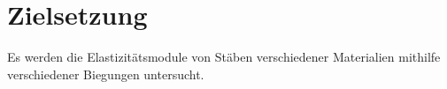 
\section{Zielsetzung}
\label{sec:Zielsetzung}
Es werden die Elastizitätsmodule von Stäben verschiedener Materialien mithilfe
 verschiedener Biegungen untersucht.
